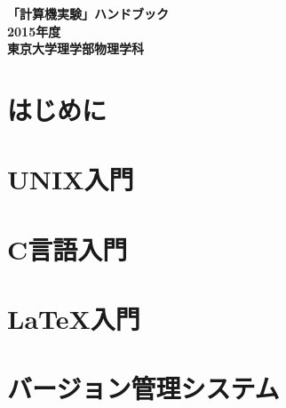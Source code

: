 \documentclass[a4j]{jsbook}
\newcommand{\nendo}{2015}
\begin{document}
\thispagestyle{empty}
\pagestyle{empty}
\begin{titlepage}
\vspace*{5cm}
\begin{center}
{\Huge\bf 「計算機実験」ハンドブック}\\
\vspace*{14cm}
{\LARGE\bf \nendo 年度}\\
\vspace{1.0cm}
{\LARGE\bf 東京大学理学部物理学科}
\end{center}
\end{titlepage}
\clearpage
\pagestyle{plain}
\cleardoublepage

\setcounter{page}{1}
\tableofcontents
\cleardoublepage

\chapter{はじめに}


\chapter{UNIX入門}


\chapter{C言語入門}


\chapter{\LaTeX 入門}


\appendix

\chapter{バージョン管理システム}


%


%
\end{document}
